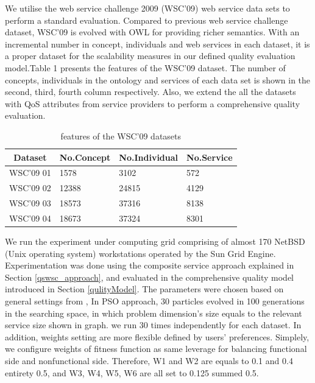 \documentclass{llncs}
\begin{document}
We utilise the web service challenge 2009 (WSC’09) web service data sets to perform a standard evaluation. Compared to previous web service challenge dataset, WSC'09 is evolved with OWL for providing richer semantics. With an incremental number in concept, individuals and web services in each dataset, it is a proper dataset for the scalability measures in our defined quality evaluation model.Table 1 presents the features of the WSC’09 dataset. The number of concepts, individuals in the ontology and services of each data set is shown in the second, third, fourth column respectively. Also, we extend the all the datasets with QoS attributes from service providers to perform a comprehensive quality evaluation. 
\begin{table}[]
\centering
\caption{features of the WSC'09 datasets}
\label{wsc09datasetTable}
\begin{tabular}{|l|l|l|l|}
\hline
\multicolumn{1}{|c|}{Dataset} & No.Concept & No.Individual & No.Service \\ \hline
WSC'09 01                     & 1578       &3102           &572      \\ \hline
WSC'09 02                     & 12388      &24815          &4129      \\ \hline
WSC'09 03                     & 18573      &37316          &8138      \\ \hline
WSC'09 04                     & 18673      &37324          &8301      \\ \hline
\end{tabular}
\end{table}


We run the experiment under computing grid comprising of almost 170 NetBSD (Unix operating system) workstations operated by the Sun Grid Engine. Experimentation was done using the composite service approach explained in Section \ref{qswsc_approach}, and evaluated in the comprehensive quality model introduced in Section \ref{qulityModel}. The parameters were chosen based on general settings from \cite{shi2001particle}, In PSO approach, 30 particles evolved in 100 generations in the searching space, in which problem dimension's size equals to the relevant service size shown in graph. we run 30 times independently for each dataset. In addition, weights setting are more flexible defined by users' preferences. Simplely, we configure weights of fitness function as same leverage for balancing functional side and nonfunctional side. Therefore, W1 and W2 are equals to 0.1 and 0.4 entirety 0.5,  and W3, W4, W5, W6 are all set to 0.125 summed 0.5.
\end{document}
